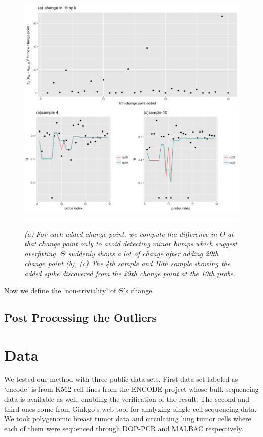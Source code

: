 \documentclass[11pt]{article}
\begin{document}
\begin{figure}[h]
\centering
\includegraphics[width=0.8\linewidth]{deltasum_chr21.png}\\
\includegraphics[width=0.8\linewidth]{sample410.png}\\
    \rule{\textwidth}{1pt}
\caption{\textit{\label{deltasum}(a) For each added change point, we compute the difference in $\Theta$ at that change point only to avoid detecting minor bumps which suggest overfitting. $\Theta$ suddenly shows a lot of change after adding 29th change point (b), (c) The 4th sample and 10th sample showing the added spike discovered from the 29th change point at the 10th probe. }}
\end{figure}

\noindent Now we define the `non-triviality' of $\Theta$'s change. 

\subsection{Post Processing the Outliers}


\section{Data}
We tested our method with three public data sets. First data set labeled as `encode' is from K562 cell lines from the ENCODE project whose bulk sequencing data is available as well, enabling the verification of the result. The second and third ones come from Ginkgo's web tool for analyzing single-cell sequencing data. We took polygenomic breast tumor data and circulating lung tumor cells where each of them were sequenced through DOP-PCR and MALBAC respectively. \\
\end{document}
